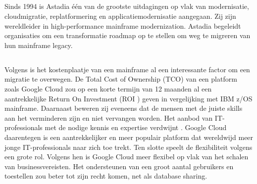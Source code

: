 \subsection{}
\label{sec:Wat is Astadia?}

Sinds 1994 is Astadia één van de grootste uitdagingen op vlak van modernisatie, cloudmigratie, replatformering en applicatiemodernisatie aangegaan. Zij zijn wereldleider in high-performance mainframe modernization. Astadia begeleidt organisaties om een transformatie roadmap op te stellen om weg te migreren van hun mainframe legacy. 

\subsection{}
\label{sec:Waarom zouden we onze mainframe legacy en databases migreren naar Google Cloud?}

Volgens \textcite{Astadia2021} is het kostenplaatje van een mainframe al een interessante factor om een migratie te overwegen. De Total Cost of Ownership (TCO) van een platform zoals Google Cloud zou op een korte termijn van 12 maanden al een aantrekkelijke Return On Investment (ROI ) geven in vergelijking met IBM z/OS mainframe. Daarnaast beweren zij eveneens dat de mensen met de juiste skills aan het verminderen zijn en niet vervangen worden. Het aanbod van IT-professionals met de nodige kennis en expertise verdwijnt \autocite{Astadia2021}. Google Cloud daarentegen is een aantrekkelijker en meer populair platform dat wereldwijd meer jonge IT-professionals naar zich toe trekt. Ten slotte speelt de flexibiliteit volgens \textcite{Astadia2021} een grote rol. Volgens hen is Google Cloud meer flexibel op vlak van het schalen van businessvereisten. Het ondersteunen van een groot aantal gebruikers en toestellen zou beter tot zijn recht komen, net als database sharing. 

